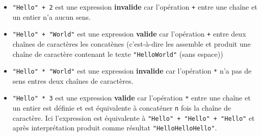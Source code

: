 \documentclass[a4paper,17pt]{extarticle}
\providecommand{\tightlist}{%
      \setlength{\itemsep}{0pt}\setlength{\parskip}{0pt}}
\begin{document}
\begin{itemize}
\tightlist
\item
  \texttt{"Hello"\ +\ 2} est une expression \textbf{invalide} car
  l'opération \texttt{+} entre une chaîne et un entier n'a aucun sens.
\item
  \texttt{"Hello"\ +\ "World"} est une expression \textbf{valide} car
  l'opération \texttt{+} entre deux chaînes de caractères les concatènes
  (c'est-à-dire les assemble et produit une chaîne de caractère
  contenant le texte \texttt{"HelloWorld"} (sans espace))
\item
  \texttt{"Hello"\ *\ "World"} est une expression \textbf{invalide} car
  l'opération \texttt{*} n'a pas de sens entres deux chaînes de
  caractères.
\item
  \texttt{"Hello"\ *\ 3} est une expression \textbf{valide} car
  l'opération \texttt{*} entre une chaîne et un entier est définie et
  est équivalente à concaténer \texttt{n} fois la chaîne de caractère.
  Ici l'expression est équivalente à
  \texttt{"Hello"\ +\ "Hello"\ +\ "Hello"} et après interprétation
  produit comme résultat \texttt{"HelloHelloHello"}.
\end{itemize}
\end{document}

